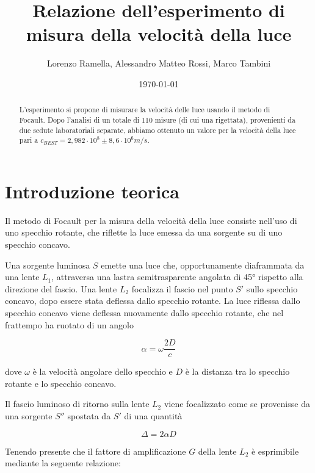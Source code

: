 \documentclass{article}
\title{Relazione dell'esperimento di misura della velocità della luce}
\author{Lorenzo Ramella, Alessandro Matteo Rossi, Marco Tambini}
\date{\today}
\begin{document}
\maketitle

\begingroup{}
\begin{abstract}
    \centering
L’esperimento si propone di misurare la velocità delle luce usando il metodo di Focault. Dopo l'analisi di un totale di 110 misure (di cui una rigettata), provenienti 
da due sedute laboratoriali separate, abbiamo ottenuto un valore per la velocità della luce pari a $c_{BEST}=2,982\cdot10^8 \pm 8,6\cdot 10^6 m/s$.
\end{abstract}
\endgroup


\tableofcontents
\newpage


\section{Introduzione teorica}
Il metodo di Focault per la misura della velocità della luce consiste nell'uso di uno specchio rotante, che riflette la luce emessa da una sorgente su di uno specchio 
concavo. 

Una sorgente luminosa $S$ emette una luce che, opportunamente diaframmata da una lente $L_1$, attraversa una lastra semitrasparente angolata di 45° rispetto alla 
direzione del fascio. Una lente $L_2$ focalizza il fascio nel punto $S'$ sullo specchio concavo, dopo essere stata deflessa dallo specchio rotante. La luce riflessa 
dallo specchio concavo viene deflessa nuovamente dallo specchio rotante, che nel frattempo ha ruotato di un angolo 

\begin{equation}
\alpha = \omega \frac{2D}{c}
\end{equation}

dove $\omega$ è la velocità angolare dello specchio e $D$ è la distanza tra lo specchio rotante e lo specchio concavo.

Il fascio luminoso di ritorno sulla lente $L_2$ viene focalizzato come se provenisse da una sorgente $S''$ spostata da $S'$ di una quantità 

\begin{equation}
\Delta = 2 \alpha D
\label{DELTA}
\end{equation}

Tenendo presente che il fattore di amplificazione $G$ della lente $L_2$ è esprimibile mediante la seguente relazione:
\end{document}
